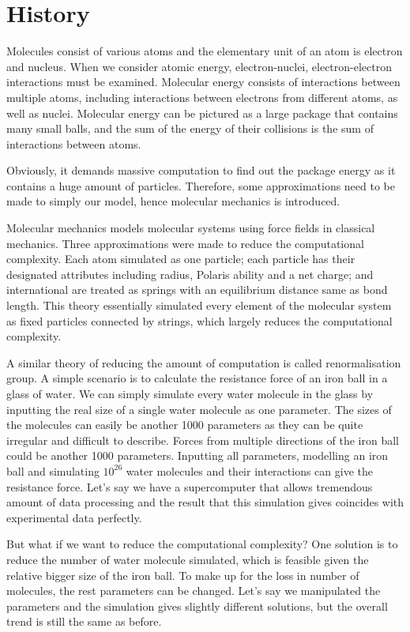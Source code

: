 \documentclass[12pt]{article}
\begin{document}
\section{History}
Molecules consist of various atoms and the elementary unit of an atom is electron and nucleus. When we consider atomic energy, electron-nuclei, electron-electron interactions must be examined. Molecular energy consists of interactions between multiple atoms, including interactions between electrons from different atoms, as well as nuclei. Molecular energy can be pictured as a large package that contains many small balls, and the sum of the energy of their collisions is the sum of interactions between atoms. 

Obviously, it demands massive computation to find out the package energy as it contains a huge amount of particles. Therefore, some approximations need to be made to simply our model, hence molecular mechanics is introduced.

Molecular mechanics models molecular systems using force fields in classical mechanics. Three approximations were made to reduce the computational complexity. Each atom simulated as one particle; each particle has their designated attributes including radius, Polaris ability and a net charge; and international are treated as springs with an equilibrium distance same as bond length. This theory essentially simulated every element of the molecular system as fixed particles connected by strings, which largely reduces the computational complexity.

A similar theory of reducing the amount of computation is called renormalisation group. A simple scenario is to calculate the resistance force of an iron ball in a glass of water. We can simply simulate every water molecule in the glass by inputting the real size of a single water molecule as one parameter. The sizes of the molecules can easily be another 1000 parameters as they can be quite irregular and difficult to describe. Forces from multiple directions of the iron ball could be another 1000 parameters. Inputting all parameters, modelling an iron ball and simulating $10^26$ water molecules and their interactions can give the resistance force. Let’s say we have a supercomputer that allows tremendous amount of data processing and the result that this simulation gives coincides with experimental data perfectly.

But what if we want to reduce the computational complexity? One solution is to reduce the number of water molecule simulated, which is feasible given the relative bigger size of the iron ball. To make up for the loss in number of molecules, the rest parameters can be changed. Let’s say we manipulated the parameters and the simulation gives slightly different solutions, but the overall trend is still the same as before. 
\end{document}
